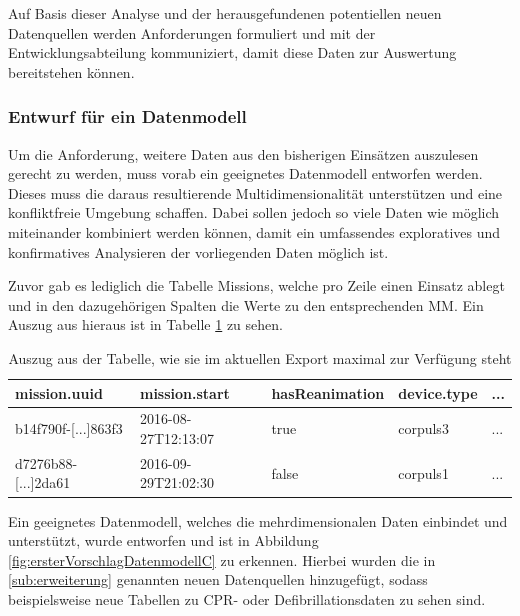 Auf Basis dieser Analyse und der herausgefundenen potentiellen neuen Datenquellen werden Anforderungen formuliert und mit der Entwicklungsabteilung kommuniziert, damit diese Daten zur Auswertung bereitstehen können.

\subsubsection{Entwurf für ein Datenmodell}
\label{subsub:datenmodell}
Um die Anforderung, weitere Daten aus den bisherigen Einsätzen auszulesen gerecht zu werden, muss vorab ein geeignetes Datenmodell entworfen werden.
Dieses muss die daraus resultierende Multidimensionalität unterstützen und eine konfliktfreie Umgebung schaffen.
Dabei sollen jedoch so viele Daten wie möglich miteinander kombiniert werden können, damit ein umfassendes exploratives und konfirmatives Analysieren der vorliegenden Daten möglich ist.

Zuvor gab es lediglich die Tabelle \glqq Missions\grqq{}, welche pro Zeile einen Einsatz ablegt und in den dazugehörigen Spalten die Werte zu den entsprechenden \gls{MM}.
Ein Auszug aus hieraus ist in Tabelle \ref{tbl:missions} zu sehen.

\begin{table}[htb]
\centering
\begin{tabular}{|l|l|l|l|l|}
\hline
\textbf{mission.uuid}   & \textbf{mission.start} & \textbf{hasReanimation} & \textbf{device.type} & \textbf{...} \\ \hline
b14f790f-{[}...{]}863f3 & 2016-08-27T12:13:07    & true                    & corpuls3             & ...          \\ \hline
d7276b88-{[}...{]}2da61 & 2016-09-29T21:02:30    & false                   & corpuls1             & ...          \\ \hline
\end{tabular}%
\caption[Aktuelle Export-Tabelle]{Auszug aus der Tabelle, wie sie im aktuellen Export maximal zur Verfügung steht}
\label{tbl:missions}
\end{table}

Ein geeignetes Datenmodell, welches die mehrdimensionalen Daten einbindet und unterstützt, wurde entworfen und ist in Abbildung \ref{fig:ersterVorschlagDatenmodellC} zu erkennen.
Hierbei wurden die in \ref{sub:erweiterung} genannten neuen Datenquellen hinzugefügt, sodass beispielsweise neue Tabellen zu \gls{CPR}- oder Defibrillationsdaten zu sehen sind.

